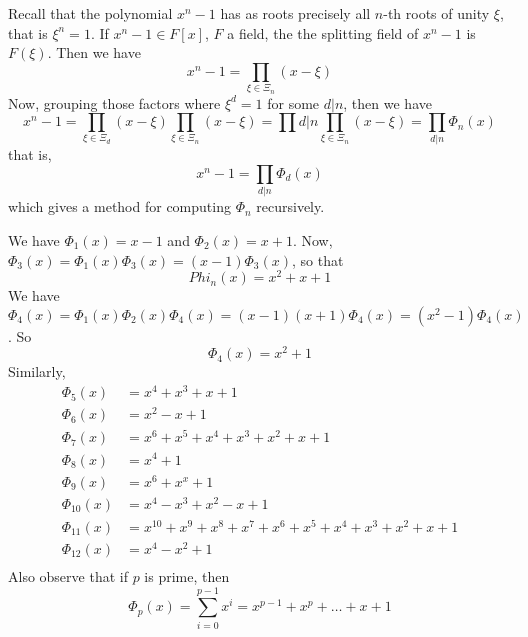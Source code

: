 \begin{example}\label{1.18}
    Recall that the polynomial $x^n-1$ has as roots precisely all  $n$-th roots
    of unity  $\xi$, that is $\xi^n=1$. If $x^n-1 \in F[x]$, $F$ a field, the
    the splitting field of  $x^n-1$ is  $F(\xi)$. Then we have
    \begin{equation*}
        x^n-1=\prod_{\xi \in \Xi_n}{(x-\xi)}
    \end{equation*}
    Now, grouping those factors where $\xi^d=1$ for some  $d|n$, then we have
    \begin{equation*}
        x^n-1=\prod_{\xi \in \Xi_d}{(x-\xi)}\prod_{\xi \in \Xi_n}{(x-\xi)}=
        \prod{d|n}{\prod_{\xi \in \Xi_n}{(x-\xi)}}=\prod_{d|n}{\Phi_n(x)}
    \end{equation*}
    that is,
    \begin{equation*}
        x^n-1=\prod_{d|n}{\Phi_d(x)}
    \end{equation*}
    which gives a method for computing $\Phi_n$ recursively.

    We have  $\Phi_1(x)=x-1$ and $\Phi_2(x)=x+1$. Now,
    $\Phi_3(x)=\Phi_1(x)\Phi_3(x)=(x-1)\Phi_3(x)$, so that
    \begin{equation*}
        Phi_n(x)=x^2+x+1
    \end{equation*}
    We have
    $\Phi_4(x)=\Phi_1(x)\Phi_2(x)\Phi_4(x)=(x-1)(x+1)\Phi_4(x)=(x^2-1)\Phi_4(x)$.
    So
    \begin{equation*}
        \Phi_4(x)=x^2+1
    \end{equation*}
    Similarly,
    \begin{align*}
        \Phi_5(x)   &=  x^4+x^3+x+1 \\
        \Phi_6(x)   &=  x^2-x+1 \\
        \Phi_7(x)   &=  x^6+x^5+x^4+x^3+x^2+x+1 \\
        \Phi_8(x)   &= x^4+1    \\
        \Phi_9(x)   &=  x^6+x^x+1   \\
        \Phi_{10}(x)   &=   x^4-x^3+x^2-x+1 \\
        \Phi_{11}(x)   &=   x^{10}+x^9+x^8+x^7+x^6+x^5+x^4+x^3+x^2+x+1  \\
        \Phi_{12}(x)   &=   x^4-x^2+1   \\
    \end{align*}
    Also observe that if $p$ is prime, then
    \begin{equation*}
        \Phi_p(x)=\sum_{i=0}^{p-1}{x^i}=x^{p-1}+x^p+\dots+x+1
    \end{equation*}
\end{example}

